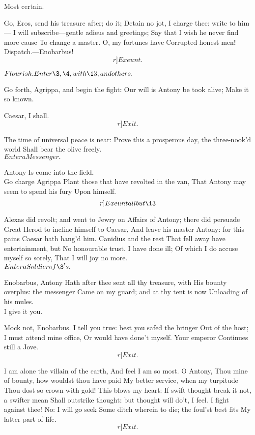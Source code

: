 \documentclass{book}
\begin{document}
	Most certain.

\1	Go, Eros, send his treasure after; do it;
	Detain no jot, I charge thee: write to him---
	I will subscribe---gentle adieus and greetings;
	Say that I wish he never find more cause
	To change a master. O, my fortunes have
	Corrupted honest men! Dispatch.---Enobarbus! \[r]Exeunt.\]





	\(Flourish. Enter \3, \4, with \13,\\ and others.\)

\3	Go forth, Agrippa, and begin the fight:
	Our will is Antony be took alive;
	Make it so known.

\4	Caesar, I shall.  	\[r]Exit.\]

\3	The time of universal peace is near:
	Prove this a prosperous day, the three-nook'd world
	Shall bear the olive freely. \\

	\(Enter a Messenger.\)

	Antony
	Is come into the field. \\

\3	Go charge Agrippa
	Plant those that have revolted in the van,
	That Antony may seem to spend his fury
	Upon himself. 	\[r]Exeunt all but \13\]

	Alexas did revolt; and went to Jewry on
	Affairs of Antony; there did persuade
	Great Herod to incline himself to Caesar,
	And leave his master Antony: for this pains
	Caesar hath hang'd him. Canidius and the rest
	That fell away have entertainment, but
	No honourable trust. I have done ill;
	Of which I do accuse myself so sorely,
	That I will joy no more. \\

	\(Enter a Soldier of \3's.\)

	Enobarbus, Antony
	Hath after thee sent all thy treasure, with
	His bounty overplus: the messenger
	Came on my guard; and at thy tent is now
	Unloading of his mules. \\

	I give it you.

	Mock not, Enobarbus.
	I tell you true: best you safed the bringer
	Out of the host; I must attend mine office,
	Or would have done't myself. Your emperor
	Continues still a Jove. \[r]Exit.\]

	I am alone the villain of the earth,
	And feel I am so most. O Antony,
	Thou mine of bounty, how wouldst thou have paid
	My better service, when my turpitude
	Thou dost so crown with gold! This blows my heart:
	If swift thought break it not, a swifter mean
	Shall outstrike thought: but thought will do't, I feel.
	I fight against thee! No: I will go seek
	Some ditch wherein to die; the foul'st best fits
	My latter part of life. 	\[r]Exit.\]
\end{document}
